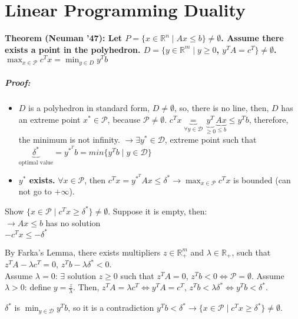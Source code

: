 \documentclass[main]{subfiles}
\begin{document}

\section{Linear Programming Duality}

\textbf{Theorem (Neuman '47): Let $P = \{x \in \mathbb{R}^n \mid Ax \leq b \}
\neq \emptyset$. Assume there exists a point in the polyhedron. $D = \{ y \in
\mathbb{R}^m \mid y \geq 0$, $y^TA = c^T\} \neq \emptyset$.
\emph{$\displaystyle \max_{x \in \mathcal{P}} c^{T}x = \min_{y \in D} y^T b$ }}

\subparagraph{Proof:}
\begin{itemize}
\item $D$ is a polyhedron in standard form, $D \neq \emptyset$, so, there is no
line, then, $D$ has an extreme point $x^* \in \mathcal{P}$, because
$\mathcal{P} \neq \emptyset$. 
$c^T x \underbrace{=}_{\forall y \in \mathcal{D}} \underbrace{y^T}_{\geq 0}
\underbrace{Ax}_{\leq b} \leq y^T b$, therefore, the minimum is not infinity.
$\rightarrow \exists y^* \in \mathcal{D}$, extreme point such that
$\underbrace{\delta^*}_{\text{optimal value}} = y^{*^T} b = min\{y^T b \mid y
\in \mathcal{D}\}$
\item \textbf{$y^*$ exists.}
$\forall x \in \mathcal{P}$, then $c^T x = y^{*^T}Ax \leq \delta^* \rightarrow
\displaystyle \max_{x \in \mathcal{P}} c^{T}x$ is bounded (can not go to
$+\infty$).
\end{itemize}

Show $\{x \in\mathcal{P} \mid c^T x \geq \delta^* \} \neq \emptyset$. Suppose
it is empty, then:\\
$\rightarrow Ax \leq b$ has no solution \\
$-c^T x \leq -\delta^*$

By Farka's Lemma, there exists multipliers $z \in \mathbb{R}_{+}^{m}$ and
$\lambda \in \mathbb{R}_{+}$, such that $z^T A - \lambda c^T = 0$, $z^T b -
\lambda \delta^* < 0$.\\
Assume $\lambda = 0$: $\exists$ solution $z \geq 0$ such that $z^T A = 0$,
$z^T b < 0 \iff \mathcal{P} = \emptyset$.
Assume $\lambda > 0$: define $y = \frac{z}{\lambda}$. Then, $z^T A = \lambda 
c^T \iff y^T A = c^T$, $z^T b < \lambda \delta^* \iff y^T b < \delta^*$.

$\delta^*$ is $\displaystyle \min_{y \in \mathcal{D}} y^{T}b$, so it is a
contradiction $y^T b < \delta^* \rightarrow \{ x \in \mathcal{P} \mid c^T x 
\geq \delta^*\} \neq \emptyset$.
\end{document}

